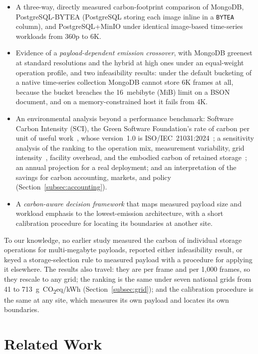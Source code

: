 \documentclass[pdflatex,sn-basic]{sn-jnl}%
\begin{document}
\begin{itemize}
  \item A three-way, directly measured carbon-footprint comparison of MongoDB, PostgreSQL-BYTEA (PostgreSQL storing each image inline in a \texttt{BYTEA} column), and PostgreSQL+MinIO under identical image-based time-series workloads from 360p to 6K.
  \item Evidence of a \emph{payload-dependent emission crossover}, with MongoDB greenest at standard resolutions and the hybrid at high ones under an equal-weight operation profile, and two infeasibility results: under the default bucketing of a native time-series collection MongoDB cannot store 6K frames at all, because the bucket breaches the 16~mebibyte (MiB) limit on a BSON document, and on a memory-constrained host it fails from 4K.
  \item An environmental analysis beyond a performance benchmark: Software Carbon Intensity (SCI), the Green Software Foundation's rate of carbon per unit of useful work~\citep{gsf_sci}, whose version~1.0 is ISO/IEC~21031:2024~\citep{iso_iec_21031_sci}; a sensitivity analysis of the ranking to the operation mix, measurement variability, grid intensity~\citep{owid_carbon_intensity}, facility overhead, and the embodied carbon of retained storage~\citep{tannu_ssd_embodied,gupta_chasing_carbon}; an annual projection for a real deployment; and an interpretation of the savings for carbon accounting, markets, and policy (Section~\ref{subsec:accounting}).
  \item A \emph{carbon-aware decision framework} that maps measured payload size and workload emphasis to the lowest-emission architecture, with a short calibration procedure for locating its boundaries at another site.
\end{itemize}

To our knowledge, no earlier study measured the carbon of individual storage operations for multi-megabyte payloads, reported either infeasibility result, or keyed a storage-selection rule to measured payload with a procedure for applying it elsewhere. The results also travel: they are per frame and per 1{,}000 frames, so they rescale to any grid; the ranking is the same under seven national grids from 41 to 713~g~CO\textsubscript{2}eq/kWh (Section~\ref{subsec:grid}); and the calibration procedure is the same at any site, which measures its own payload and locates its own boundaries.

\section{Related Work}\label{sec:related_work}
\end{document}
